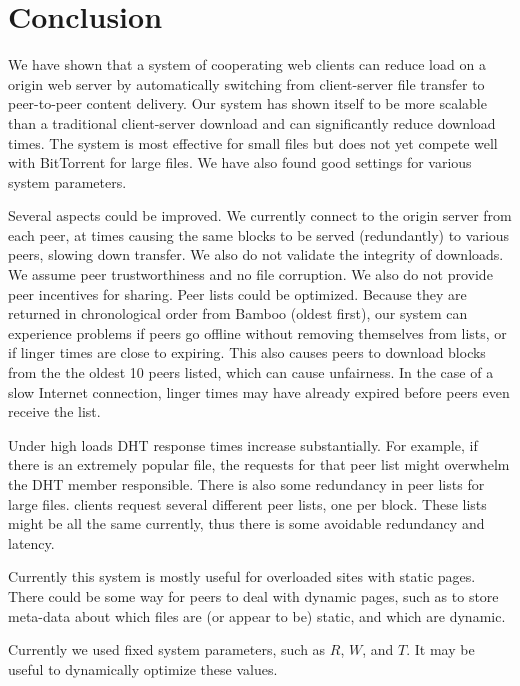 \section{Conclusion}

We have shown that a system of cooperating web clients can reduce load on a origin web server by automatically switching
from client-server file transfer to peer-to-peer content delivery. Our system has shown itself to be more scalable 
than a traditional client-server download and can significantly
reduce download times.  The system is most effective for small files but does not yet compete well with
BitTorrent for large files.  We have also found good settings for various system parameters.

Several aspects could be improved.  We currently connect to the origin
server from each peer, at times causing the same blocks to be served (redundantly) to various peers, slowing down transfer.
We also do not validate the integrity of downloads.  We assume peer trustworthiness and no file corruption.  We also do not provide peer incentives for sharing.
Peer lists could be optimized.  Because they are returned in chronological order from Bamboo (oldest first), our system can experience problems if peers
go offline without removing themselves from lists, or if linger times are close to expiring.  This also causes peers to download blocks 
from the the oldest 10 peers listed, which can cause unfairness. In the case of a slow Internet connection, linger times may have
already expired before peers even receive the list.

Under high loads DHT response times increase substantially.  For example, if there is an extremely popular file, the 
requests for that peer list might overwhelm the DHT member responsible.  There is also some redundancy in peer lists for large files.  
clients request several different peer lists, one per block.  These lists might be all the same currently, thus
there is some avoidable redundancy and latency.

Currently this system is mostly useful for overloaded sites with static pages.  There could be some way for peers to deal with dynamic pages, such as to
store meta-data about which files are (or appear to be) static, and which are dynamic.  

Currently we used fixed system parameters, such as $R$, $W$, and $T$.  It may be useful to dynamically optimize these values.